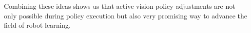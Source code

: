 Combining these ideas shows us that active vision policy adjustments are not only possible during policy execution but also very promising way to advance the field of robot learning.



